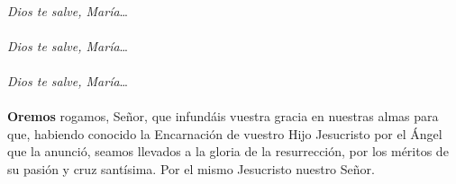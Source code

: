 \\[1mm]
\textit{Dios te salve, María}\ldots\\[1mm]
\\[1mm]
\textit{Dios te salve, María}\ldots\\[1mm]
\\[1mm]
\textit{Dios te salve, María}\ldots\\[1mm]
\ruegapornosotrossalve\\[2mm]
\textbf{Oremos}
 rogamos, Señor, que infundáis vuestra gracia en nuestras almas para que,
habiendo conocido la Encarnación de vuestro Hijo Jesucristo por el Ángel que la anunció,
seamos llevados a la gloria de la resurrección, por los méritos de su pasión y cruz santísima.
Por el mismo Jesucristo nuestro Señor.\\[1mm]
